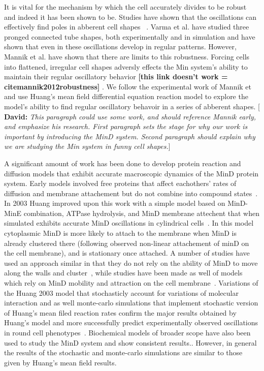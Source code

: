 \documentclass[letterpaper,twocolumn,amsmath,amssymb,pre]{revtex4-1}
\newcommand{\red}[1]{{\bf \color{red} #1}}
\newcommand{\green}[1]{{\bf \color{green} #1}}
\newcommand{\fixme}[1]{\red{[#1]}}
\newcommand{\davidsays}[1]{{\color{red} [\green{David:} \emph{#1}]}}
\begin{document}
It is vital for the mechanism by which the cell accurately divides to
be robust and indeed it has been shown to
be\cite{touhami2006temperature}.  Studies have shown that the
oscillations can effectively find poles in abberent cell
shapes~\cite{corbin2002exploring} \cite{juarez2010changes}.  Varma et
al. have studied three pronged connected tube shapes, both
experimentally and in simulation\cite{varma2008min} and have shown
that even in these oscillations develop in regular patterns. However,
Mannik et al. have shown that there are limits to this
robustness. Forcing cells into flattened, irregular cell shapes
adversly effects the Min system's ability to maintain their regular
oscillatory behavior \fixme{this link doesn't work =
  cite{mannik2012robustness}} \cite{mannik2010bacteria}
\cite{mannik2009bacterial}.  We follow the experimental work of Mannik
et and use Huang's mean field differential equation reaction model to
explore the model's ability to find regular oscillatory behavoir in a
series of abberent shapes.  \davidsays{This paragraph could use some
  work, and should reference Mannik early, and emphasize his research.
  First paragraph sets the stage for why our work is important by
  introducing the MinD system.  Second paragraph should explain why we
  are studying the Min system in funny cell shapes.}

A significant amount of work has been done to develop protein reaction
and diffusion models that exhibit accurate macroscopic dynamics of the
MinD protein system. Early models involved free proteins that affect
eachothers' rates of diffusion and membrane attachement but do not
combine into compound states~\cite{meinhardt2001pattern}.  In 2003
Huang improved upon this work with a simple model based on MinD-MinE
combination, ATPase hydrolysis, and MinD membrane attechent that when
simulated exhibits accurate MinD oscillations in cylindrical
cells~\cite{huang2003dynamic}. In this model cytoplasmic MinD is more
likely to attach to the membrane when MinD is already clustered there
(following observed non-linear attachement of minD on the cell
membrane), and is stationary once attached.  A number of studies have
used an approach similar in that they do not rely on the ability of
MinD to move along the walls and
cluster~\cite{kruse2007experimentalist, meinhardt2001pattern,
  drew2005polymerization, fange2006noise, kerr2006division}, while
studies have been made as well of models which rely on MinD mobility
and attraction on the cell membrane~\cite{kruse2002dynamic,
  howard2005cellular}.  Variations of the Huang 2003 model that
stochasticly account for variations of molecular interaction
\cite{fange2006noise} and as well monte-carlo simulations that
implement stochastic version of Huang's mean filed reaction rates
confirm the major results obtained by Huang's model and more
successfully predict experimentally observed oscillations in round
cell phenotypes~\cite{drew2005polymerization, fange2006noise,
  huang2004min}. Biochemical models of broader scope have also been
used to study the MinD system and show consistent
results.\cite{arjunan2010new}.  However, in general the results of the
stochastic and monte-carlo simulations are similar to those given by
Huang's mean field results.
\end{document}
